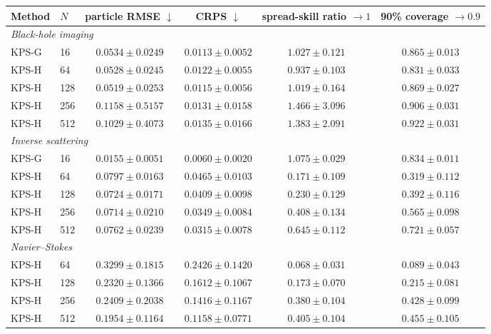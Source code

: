 \small
\begin{tabular}{llcccc}
\toprule
Method & $N$ & \shortstack{particle\\RMSE $\downarrow$} & \shortstack{CRPS\\$\downarrow$} & \shortstack{spread-skill\\ratio $\to 1$} & \shortstack{90\% coverage\\$\to 0.9$} \\
\midrule
\multicolumn{6}{l}{\itshape Black-hole imaging} \\
KPS-G & 16 & $0.0534 \pm 0.0249$ & $0.0113 \pm 0.0052$ & $1.027 \pm 0.121$ & $0.865 \pm 0.013$ \\
KPS-H & 64 & $0.0528 \pm 0.0245$ & $0.0122 \pm 0.0055$ & $0.937 \pm 0.103$ & $0.831 \pm 0.033$ \\
KPS-H & 128 & $0.0519 \pm 0.0253$ & $0.0115 \pm 0.0056$ & $1.019 \pm 0.164$ & $0.869 \pm 0.027$ \\
KPS-H & 256 & $0.1158 \pm 0.5157$ & $0.0131 \pm 0.0158$ & $1.466 \pm 3.096$ & $0.906 \pm 0.031$ \\
KPS-H & 512 & $0.1029 \pm 0.4073$ & $0.0135 \pm 0.0166$ & $1.383 \pm 2.091$ & $0.922 \pm 0.031$ \\
\midrule
\multicolumn{6}{l}{\itshape Inverse scattering} \\
KPS-G & 16 & $0.0155 \pm 0.0051$ & $0.0060 \pm 0.0020$ & $1.075 \pm 0.029$ & $0.834 \pm 0.011$ \\
KPS-H & 64 & $0.0797 \pm 0.0163$ & $0.0465 \pm 0.0103$ & $0.171 \pm 0.109$ & $0.319 \pm 0.112$ \\
KPS-H & 128 & $0.0724 \pm 0.0171$ & $0.0409 \pm 0.0098$ & $0.230 \pm 0.129$ & $0.392 \pm 0.116$ \\
KPS-H & 256 & $0.0714 \pm 0.0210$ & $0.0349 \pm 0.0084$ & $0.408 \pm 0.134$ & $0.565 \pm 0.098$ \\
KPS-H & 512 & $0.0762 \pm 0.0239$ & $0.0315 \pm 0.0078$ & $0.645 \pm 0.112$ & $0.721 \pm 0.057$ \\
\midrule
\multicolumn{6}{l}{\itshape Navier--Stokes} \\
KPS-H & 64 & $0.3299 \pm 0.1815$ & $0.2426 \pm 0.1420$ & $0.068 \pm 0.031$ & $0.089 \pm 0.043$ \\
KPS-H & 128 & $0.2320 \pm 0.1366$ & $0.1612 \pm 0.1067$ & $0.173 \pm 0.070$ & $0.215 \pm 0.081$ \\
KPS-H & 256 & $0.2409 \pm 0.2038$ & $0.1416 \pm 0.1167$ & $0.380 \pm 0.104$ & $0.428 \pm 0.099$ \\
KPS-H & 512 & $0.1954 \pm 0.1164$ & $0.1158 \pm 0.0771$ & $0.405 \pm 0.104$ & $0.455 \pm 0.105$ \\
\bottomrule
\end{tabular}
